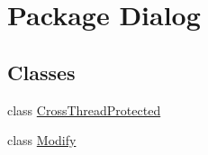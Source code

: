 \hypertarget{namespace_dialog}{\section{Package Dialog}
\label{namespace_dialog}
}
\subsection*{Classes}
\begin{DoxyCompactItemize}
\item 
class \hyperlink{class_dialog_1_1_cross_thread_protected}{Cross\+Thread\+Protected}
\item 
class \hyperlink{class_dialog_1_1_modify}{Modify}
\end{DoxyCompactItemize}
